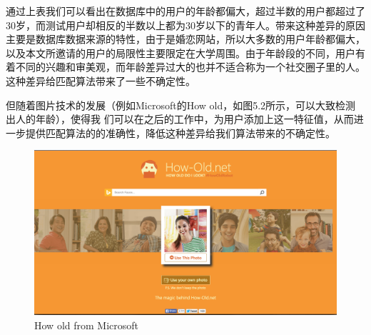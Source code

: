 通过上表我们可以看出在数据库中的用户的年龄都偏大，超过半数的用户都超过了30岁，而测试用户却相反的半数以上都为30岁以下的青年人。带来这种差异的原因主要是数据库数据来源的特性，由于是婚恋网站，所以大多数的用户年龄都偏大，以及本文所邀请的用户的局限性主要限定在大学周围。由于年龄段的不同，用户有着不同的兴趣和审美观，而年龄差异过大的也并不适合称为一个社交圈子里的人。这种差异给匹配算法带来了一些不确定性。


但随着图片技术的发展（例如Microsoft的How old，如图5.2所示，可以大致检测出人的年龄），使得我	们可以在之后的工作中，为用户添加上这一特征值，从而进一步提供匹配算法的的准确性，降低这种差异给我们算法带来的不确定性。
\begin{figure}[h]
\begin{minipage}[t]{0.65\linewidth}
\centering
\includegraphics[width=\textwidth]{img/chap5/how_old.png}
\caption{How old from Microsoft\label{Face++API}}
\end{minipage}
\end{figure}

